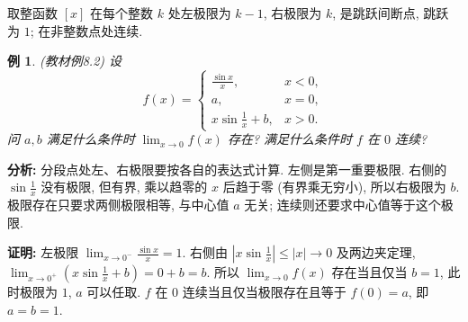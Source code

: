 \documentclass[UTF8,openany]{ctexbook}
\theoremstyle{chinesetextbook}
\newtheorem{example}{例}[section]
\newenvironment{cnproof}{\par\indent\textbf{证明:} \ignorespaces}{\par}
\begin{document}
取整函数 $[x]$ 在每个整数 $k$ 处左极限为 $k-1$, 右极限为 $k$, 是跳跃间断点, 跳跃为 $1$; 在非整数点处连续.
\begin{example}
\textnormal{(教材例8.2)} 设
\[
f(x)=\begin{cases}\frac{\sin x}{x},&x<0,\\a,&x=0,\\x\sin\frac1x+b,&x>0.\end{cases}
\]
问 $a,b$ 满足什么条件时 $\displaystyle\lim_{x\to0}f(x)$ 存在? 满足什么条件时 $f$ 在 $0$ 连续?
\end{example}
\par\indent\textbf{分析:} 分段点处左、右极限要按各自的表达式计算. 左侧是第一重要极限. 右侧的 $\displaystyle\sin\frac1x$ 没有极限, 但有界, 乘以趋零的 $x$ 后趋于零 (有界乘无穷小), 所以右极限为 $b$. 极限存在只要求两侧极限相等, 与中心值 $a$ 无关; 连续则还要求中心值等于这个极限.
\begin{cnproof}
左极限 $\displaystyle\lim_{x\to0^-}\frac{\sin x}x=1$. 右侧由 $\displaystyle\left|x\sin\frac1x\right|\le|x|\to0$ 及两边夹定理, $\displaystyle\lim_{x\to0^+}\left(x\sin\frac1x+b\right)=0+b=b$. 所以 $\displaystyle\lim_{x\to0}f(x)$ 存在当且仅当 $b=1$, 此时极限为 $1$, $a$ 可以任取. $f$ 在 $0$ 连续当且仅当极限存在且等于 $f(0)=a$, 即 $a=b=1$.
\end{cnproof}
\end{document}
